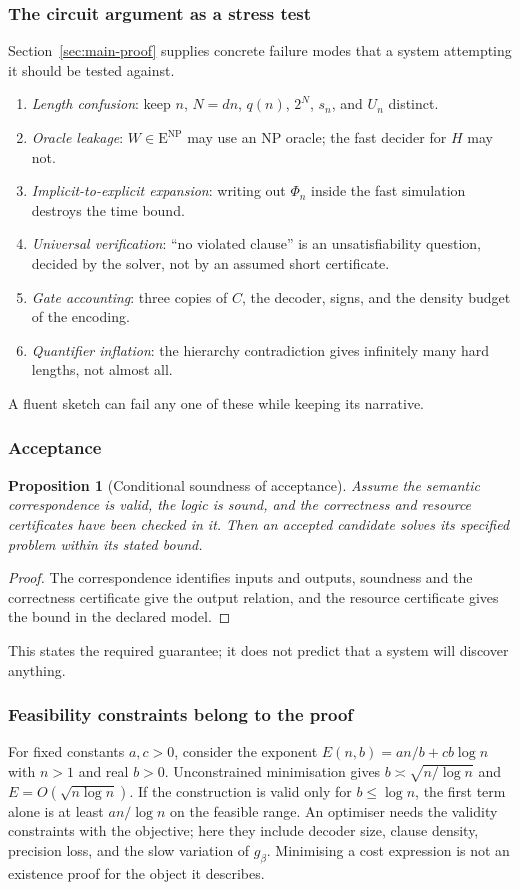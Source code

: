 \documentclass[11pt,reqno]{amsart}
\numberwithin{equation}{section}
\theoremstyle{plain}
\newtheorem{proposition}[theorem]{Proposition}
\theoremstyle{definition}
\theoremstyle{remark}
\newcommand{\ENP}{\mathrm E^{\mathrm{NP}}}
\begin{document}
\subsubsection{The circuit argument as a stress test}
Section~\ref{sec:main-proof} supplies concrete failure modes that a system
attempting it should be tested against.
\begin{enumerate}[label=(\roman*)]
\item \emph{Length confusion}: keep $n$, $N=dn$, $q(n)$, $2^N$, $s_n$, and
 $U_n$ distinct.
\item \emph{Oracle leakage}: $W\in\ENP$ may use an NP oracle; the fast
 decider for $H$ may not.
\item \emph{Implicit-to-explicit expansion}: writing out $\Phi_n$ inside the
 fast simulation destroys the time bound.
\item \emph{Universal verification}: ``no violated clause'' is an
 unsatisfiability question, decided by the solver, not by an assumed short
 certificate.
\item \emph{Gate accounting}: three copies of $C$, the decoder, signs, and
 the density budget of the encoding.
\item \emph{Quantifier inflation}: the hierarchy contradiction gives
 infinitely many hard lengths, not almost all.
\end{enumerate}
A fluent sketch can fail any one of these while keeping its narrative.

\subsubsection{Acceptance}
\begin{proposition}[Conditional soundness of acceptance]
Assume the semantic correspondence is valid, the logic is sound, and the
correctness and resource certificates have been checked in it. Then an
accepted candidate solves its specified problem within its stated bound.
\end{proposition}
\begin{proof}
The correspondence identifies inputs and outputs, soundness and the
correctness certificate give the output relation, and the resource
certificate gives the bound in the declared model.
\end{proof}
This states the required guarantee; it does not predict that a system will
discover anything.

\subsubsection{Feasibility constraints belong to the proof}
For fixed constants $a,c>0$, consider the exponent
$E(n,b)=an/b+cb\log n$ with $n>1$ and real $b>0$. Unconstrained minimisation gives
$b\asymp\sqrt{n/\log n}$ and $E=O(\sqrt{n\log n})$. If the construction is
valid only for $b\le\log n$, the first term alone is at least $an/\log n$ on
the feasible range. An optimiser needs the validity constraints with the
objective; here they include decoder size, clause density, precision loss,
and the slow variation of $g_\beta$. Minimising a cost expression is not an
existence proof for the object it describes.
\end{document}
